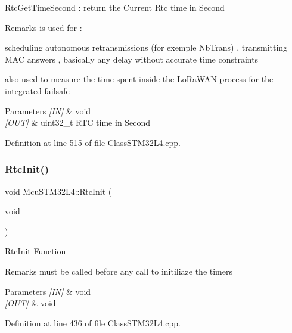 Rtc\+Get\+Time\+Second \+: return the Current Rtc time in Second \begin{DoxyRemark}{Remarks}
is used for \+: 

scheduling autonomous retransmissions (for exemple Nb\+Trans) , transmitting M\+AC answers , basically any delay without accurate time constraints 

also used to measure the time spent inside the Lo\+Ra\+W\+AN process for the integrated failsafe 
\end{DoxyRemark}

\begin{DoxyParams}{Parameters}
{\em \mbox{[}\+I\+N\mbox{]}} & void \\
\hline
{\em \mbox{[}\+O\+U\+T\mbox{]}} & uint32\+\_\+t R\+TC time in Second \\
\hline
\end{DoxyParams}


Definition at line 515 of file Class\+S\+T\+M32\+L4.\+cpp.

\mbox{\label{class_mcu_s_t_m32_l4_ac8cda7ce6ac857e05a2158998794f373}} 
\subsubsection{\texorpdfstring{Rtc\+Init()}{RtcInit()}}
{\footnotesize\ttfamily void Mcu\+S\+T\+M32\+L4\+::\+Rtc\+Init (\begin{DoxyParamCaption}\item[{void}]{ }\end{DoxyParamCaption})}

Rtc\+Init Function \begin{DoxyRemark}{Remarks}
must be called before any call to initiliaze the timers 
\end{DoxyRemark}

\begin{DoxyParams}{Parameters}
{\em \mbox{[}\+I\+N\mbox{]}} & void \\
\hline
{\em \mbox{[}\+O\+U\+T\mbox{]}} & void \\
\hline
\end{DoxyParams}


Definition at line 436 of file Class\+S\+T\+M32\+L4.\+cpp.

\mbox{\label{class_mcu_s_t_m32_l4_a3f2001f881ae5cad3a002ea92da0a481}} 

